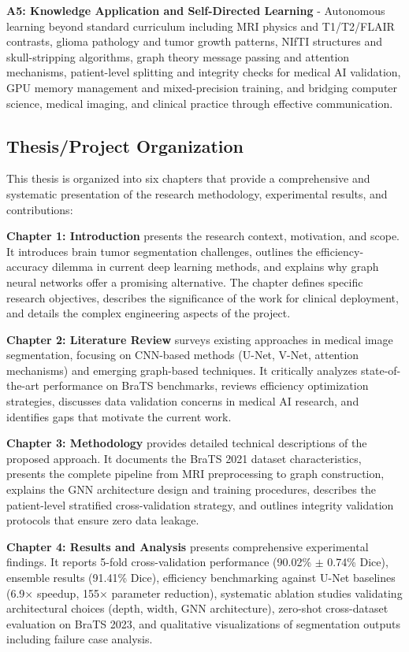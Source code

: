 \textbf{A5: Knowledge Application and Self-Directed Learning} - Autonomous learning beyond standard curriculum including MRI physics and T1/T2/FLAIR contrasts, glioma pathology and tumor growth patterns, NIfTI structures and skull-stripping algorithms, graph theory message passing and attention mechanisms, patient-level splitting and integrity checks for medical AI validation, GPU memory management and mixed-precision training, and bridging computer science, medical imaging, and clinical practice through effective communication.

 
\subsection{Thesis/Project Organization}

This thesis is organized into six chapters that provide a comprehensive and systematic presentation of the research methodology, experimental results, and contributions:

\textbf{Chapter 1: Introduction} presents the research context, motivation, and scope. It introduces brain tumor segmentation challenges, outlines the efficiency-accuracy dilemma in current deep learning methods, and explains why graph neural networks offer a promising alternative. The chapter defines specific research objectives, describes the significance of the work for clinical deployment, and details the complex engineering aspects of the project.

\textbf{Chapter 2: Literature Review} surveys existing approaches in medical image segmentation, focusing on CNN-based methods (U-Net, V-Net, attention mechanisms) and emerging graph-based techniques. It critically analyzes state-of-the-art performance on BraTS benchmarks, reviews efficiency optimization strategies, discusses data validation concerns in medical AI research, and identifies gaps that motivate the current work.

\textbf{Chapter 3: Methodology} provides detailed technical descriptions of the proposed approach. It documents the BraTS 2021 dataset characteristics, presents the complete pipeline from MRI preprocessing to graph construction, explains the GNN architecture design and training procedures, describes the patient-level stratified cross-validation strategy, and outlines integrity validation protocols that ensure zero data leakage.

\textbf{Chapter 4: Results and Analysis} presents comprehensive experimental findings. It reports 5-fold cross-validation performance (90.02\% $\pm$ 0.74\% Dice), ensemble results (91.41\% Dice), efficiency benchmarking against U-Net baselines (6.9$\times$ speedup, 155$\times$ parameter reduction), systematic ablation studies validating architectural choices (depth, width, GNN architecture), zero-shot cross-dataset evaluation on BraTS 2023, and qualitative visualizations of segmentation outputs including failure case analysis.

